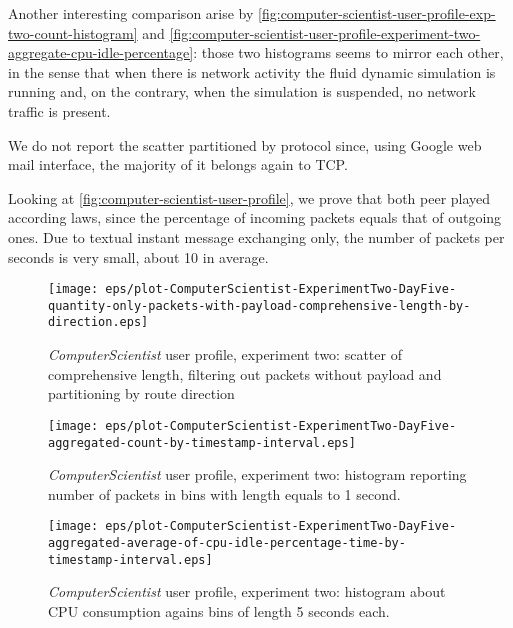 \documentclass[10pt,a4paper]{article}
\begin{document}
    Another interesting comparison arise by
    \autoref{fig:computer-scientist-user-profile-exp-two-count-histogram}
    and
    \autoref{fig:computer-scientist-user-profile-experiment-two-aggregate-cpu-idle-percentage}:
    those two histograms seems to mirror each other, in the sense that
    when there is network activity the fluid dynamic simulation is
    running and, on the contrary, when the simulation is suspended, no
    network traffic is present.

    We do not report the scatter partitioned by protocol since, using
    Google web mail interface, the majority of it belongs again to
    TCP.

    Looking at \autoref{fig:computer-scientist-user-profile}, we prove
    that both peer played according laws, since the percentage of
    incoming packets equals that of outgoing ones. Due to textual
    instant message exchanging only, the number of packets per seconds
    is very small, about 10 in average.

    \begin{figure}
      \centering
      \texttt{[image: eps/plot-ComputerScientist-ExperimentTwo-DayFive-quantity-only-packets-with-payload-comprehensive-length-by-direction.eps]}
      \caption{\emph{ComputerScientist} user profile, experiment two:
        scatter of comprehensive length, filtering out packets without
        payload and partitioning by route direction}
      \label{fig:computer-scientist-user-profile-experiment-two-comprehensive-length-scatter-filtering-on-payload-partitioned-by-direction}
    \end{figure}

    \begin{figure}
      \centering
      \texttt{[image: eps/plot-ComputerScientist-ExperimentTwo-DayFive-aggregated-count-by-timestamp-interval.eps]}
      \caption{\emph{ComputerScientist} user profile, experiment two: histogram
        reporting number of packets in bins with length equals to 1
        second.}
      \label{fig:computer-scientist-user-profile-exp-two-count-histogram}
    \end{figure}

    \begin{figure}
      \centering
      \texttt{[image: eps/plot-ComputerScientist-ExperimentTwo-DayFive-aggregated-average-of-cpu-idle-percentage-time-by-timestamp-interval.eps]}
      \caption{\emph{ComputerScientist} user profile, experiment two:
        histogram about CPU consumption agains bins of length 5
        seconds each.}
      \label{fig:computer-scientist-user-profile-experiment-two-aggregate-cpu-idle-percentage}
    \end{figure}
\end{document}

